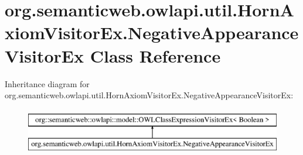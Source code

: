 \hypertarget{classorg_1_1semanticweb_1_1owlapi_1_1util_1_1_horn_axiom_visitor_ex_1_1_negative_appearance_visitor_ex}{\section{org.\-semanticweb.\-owlapi.\-util.\-Horn\-Axiom\-Visitor\-Ex.\-Negative\-Appearance\-Visitor\-Ex Class Reference}
\label{classorg_1_1semanticweb_1_1owlapi_1_1util_1_1_horn_axiom_visitor_ex_1_1_negative_appearance_visitor_ex}
}
Inheritance diagram for org.\-semanticweb.\-owlapi.\-util.\-Horn\-Axiom\-Visitor\-Ex.\-Negative\-Appearance\-Visitor\-Ex\-:\begin{figure}[H]
\begin{center}
\leavevmode
\includegraphics[height=2.000000cm]{classorg_1_1semanticweb_1_1owlapi_1_1util_1_1_horn_axiom_visitor_ex_1_1_negative_appearance_visitor_ex}
\end{center}
\end{figure}

